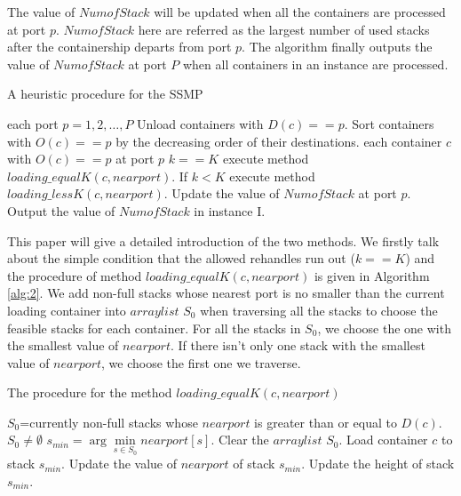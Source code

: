 \documentclass[review,3p,times,authoryear,12pt]{elsarticle}
\begin{document}
The value of $NumofStack$ will be updated when all the containers are processed at port $p$.
$NumofStack$ here are referred as the largest number of used stacks after the containership departs from port $p$.
The algorithm finally outputs the value of $NumofStack$ at port $P$ when all containers in an instance are processed.

\begin{algorithm}[!htbp]
  \caption{A heuristic procedure for the SSMP}
  \label{alg:1}
  \begin{codebox}

    \li \For each port $p=1, 2 , \ldots,P $
    \li \Do
                Unload containers with $D(c)==p$.
    \li         Sort containers with $O(c)==p$ by the decreasing order of their destinations.
    \li         \For each container $c$ with $O(c)==p$ at port $p$
    \li         \Do
                   \If $k==K$
    \li            \Then
                        execute method $loading\_equalK(c,nearport)$.
    \li            \Else If $k < K$
    \li                 execute method $loading\_lessK(c,nearport)$.
                   \End
                \End
    \li          Update the value of $NumofStack$ at port $p$.
        \End
    \li Output the value of $NumofStack$ in instance I.

 \end{codebox}
 \end{algorithm}

This paper will give a detailed introduction of the two methods.
We firstly talk about the simple condition that the allowed rehandles run out ($k==K$) and the procedure of method $loading\_equalK(c,nearport)$ is given in Algorithm \ref{alg:2}.
We add non-full stacks whose nearest port is no smaller than the current loading container into $arraylist$ $S_0$ when traversing all the stacks to choose the feasible stacks for each container.
For all the stacks in $S_0$, we choose the one with the smallest value of $nearport$.
If there isn't only one stack with the smallest value of $nearport$, we choose the first one we traverse.

\begin{algorithm}[!htbp]
    \caption{The procedure for the method $loading\_equalK(c,nearport)$}
    \label{alg:2}
    \begin{codebox}
        \li $S_0$=currently non-full stacks whose $nearport$ is greater than or equal to $D(c)$.
        \li \If $S_0 \neq \emptyset$
        \li \Then
                 $s_{min}=\arg\min \limits_{s\in S_0} nearport[s]$.
        \li      Clear the $arraylist$ $S_0$.
        \li      Load container $c$ to stack $s_{min}$.
            \End
        \li Update the value of $nearport$ of stack $s_{min}$.
        \li Update the height of stack $s_{min}$.

       \end{codebox}
\end{algorithm}
\end{document}
